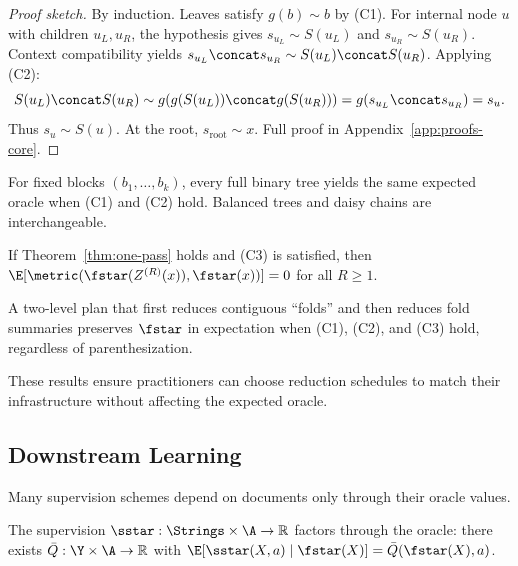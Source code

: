 \begin{proof}[Proof sketch]
By induction. Leaves satisfy $g(b) \sim b$ by (C1). For internal node $u$ with children $u_L, u_R$, the hypothesis gives $s_{u_L} \sim S(u_L)$ and $s_{u_R} \sim S(u_R)$. Context compatibility yields $s_{u_L} \concat s_{u_R} \sim S(u_L) \concat S(u_R)$. Applying (C2):
\[
S(u_L) \concat S(u_R) \sim g(g(S(u_L)) \concat g(S(u_R))) = g(s_{u_L} \concat s_{u_R}) = s_u.
\]
Thus $s_u \sim S(u)$. At the root, $s_{\text{root}} \sim x$. Full proof in Appendix~\ref{app:proofs-core}.
\end{proof}

\begin{corollary}\label{cor:schedule}
For fixed blocks $(b_1, \ldots, b_k)$, every full binary tree yields the same expected oracle when (C1) and (C2) hold. Balanced trees and daisy chains are interchangeable.
\end{corollary}

\begin{theorem}\label{thm:multi-round}
If Theorem~\ref{thm:one-pass} holds and (C3) is satisfied, then $\E[\metric(\fstar(Z^{(R)}(x)), \fstar(x))] = 0$ for all $R \geq 1$.
\end{theorem}

\begin{corollary}\label{cor:folds}
A two-level plan that first reduces contiguous ``folds'' and then reduces fold summaries preserves $\fstar$ in expectation when (C1), (C2), and (C3) hold, regardless of parenthesization.
\end{corollary}

These results ensure practitioners can choose reduction schedules to match their infrastructure without affecting the expected oracle.

\subsection{Downstream Learning}\label{sec:downstream-learning}

Many supervision schemes depend on documents only through their oracle values.

\begin{assumption}\label{ass:CF}
The supervision $\sstar: \Strings \times \A \to \mathbb{R}$ factors through the oracle: there exists $\bar{Q}: \Y \times \A \to \mathbb{R}$ with $\E[\sstar(X, a) \mid \fstar(X)] = \bar{Q}(\fstar(X), a)$.
\end{assumption}

